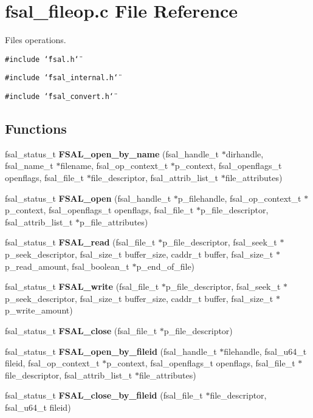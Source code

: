 \section{fsal\_\-fileop.c File Reference}
\label{fsal__fileop_8c}
Files operations.  


{\tt \#include \char`\"{}fsal.h\char`\"{}}\par
{\tt \#include \char`\"{}fsal\_\-internal.h\char`\"{}}\par
{\tt \#include \char`\"{}fsal\_\-convert.h\char`\"{}}\par
\subsection*{Functions}
\begin{CompactItemize}
\item 
fsal\_\-status\_\-t {\bf FSAL\_\-open\_\-by\_\-name} (fsal\_\-handle\_\-t $\ast$dirhandle, fsal\_\-name\_\-t $\ast$filename, fsal\_\-op\_\-context\_\-t $\ast$p\_\-context, fsal\_\-openflags\_\-t openflags, fsal\_\-file\_\-t $\ast$file\_\-descriptor, fsal\_\-attrib\_\-list\_\-t $\ast$file\_\-attributes)
\item 
fsal\_\-status\_\-t {\bf FSAL\_\-open} (fsal\_\-handle\_\-t $\ast$p\_\-filehandle, fsal\_\-op\_\-context\_\-t $\ast$p\_\-context, fsal\_\-openflags\_\-t openflags, fsal\_\-file\_\-t $\ast$p\_\-file\_\-descriptor, fsal\_\-attrib\_\-list\_\-t $\ast$p\_\-file\_\-attributes)
\item 
fsal\_\-status\_\-t {\bf FSAL\_\-read} (fsal\_\-file\_\-t $\ast$p\_\-file\_\-descriptor, fsal\_\-seek\_\-t $\ast$p\_\-seek\_\-descriptor, fsal\_\-size\_\-t buffer\_\-size, caddr\_\-t buffer, fsal\_\-size\_\-t $\ast$p\_\-read\_\-amount, fsal\_\-boolean\_\-t $\ast$p\_\-end\_\-of\_\-file)
\item 
fsal\_\-status\_\-t {\bf FSAL\_\-write} (fsal\_\-file\_\-t $\ast$p\_\-file\_\-descriptor, fsal\_\-seek\_\-t $\ast$p\_\-seek\_\-descriptor, fsal\_\-size\_\-t buffer\_\-size, caddr\_\-t buffer, fsal\_\-size\_\-t $\ast$p\_\-write\_\-amount)
\item 
fsal\_\-status\_\-t {\bf FSAL\_\-close} (fsal\_\-file\_\-t $\ast$p\_\-file\_\-descriptor)
\item 
fsal\_\-status\_\-t \textbf{FSAL\_\-open\_\-by\_\-fileid} (fsal\_\-handle\_\-t $\ast$filehandle, fsal\_\-u64\_\-t fileid, fsal\_\-op\_\-context\_\-t $\ast$p\_\-context, fsal\_\-openflags\_\-t openflags, fsal\_\-file\_\-t $\ast$file\_\-descriptor, fsal\_\-attrib\_\-list\_\-t $\ast$file\_\-attributes)\label{fsal__fileop_8c_5afa8e38170a21da36015a18d0d905a4}

\item 
fsal\_\-status\_\-t \textbf{FSAL\_\-close\_\-by\_\-fileid} (fsal\_\-file\_\-t $\ast$file\_\-descriptor, fsal\_\-u64\_\-t fileid)\label{fsal__fileop_8c_4e3271d5450b56071010e1ef556a3d80}

\end{CompactItemize}


